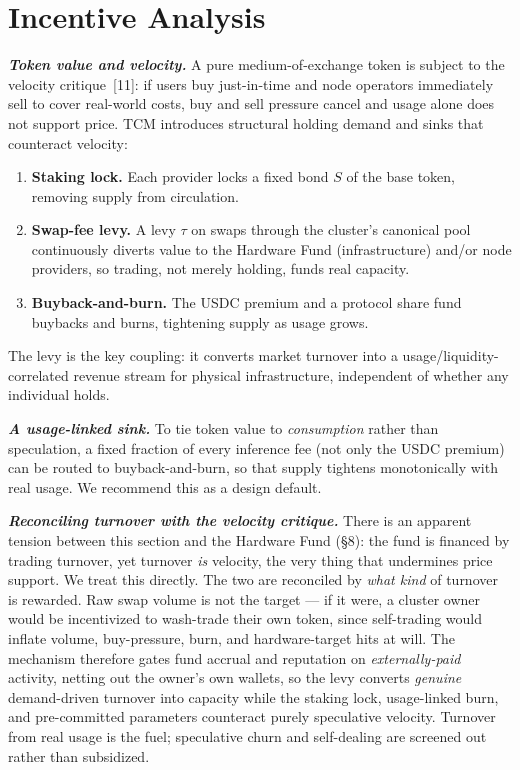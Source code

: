 \documentclass[11pt]{article}
\newcommand{\ph}[1]{\textbf{\textit{#1}}}
\begin{document}
\section{Incentive Analysis}\label{sec:incentives}
\ph{Token value and velocity.} A pure medium-of-exchange token is subject to the velocity critique~[11]: if users buy just-in-time and node operators immediately sell to cover real-world costs, buy and sell pressure cancel and usage alone does not support price. TCM introduces structural holding demand and sinks that counteract velocity:
\begin{enumerate}[leftmargin=1.4em,itemsep=0.1em]
\item \textbf{Staking lock.} Each provider locks a fixed bond $S$ of the base token, removing supply from circulation.
\item \textbf{Swap-fee levy.} A levy $\tau$ on swaps through the cluster's canonical pool continuously diverts value to the Hardware Fund (infrastructure) and/or node providers, so trading, not merely holding, funds real capacity.
\item \textbf{Buyback-and-burn.} The USDC premium and a protocol share fund buybacks and burns, tightening supply as usage grows.
\end{enumerate}
The levy is the key coupling: it converts market turnover into a usage/liquidity-correlated revenue stream for physical infrastructure, independent of whether any individual holds.

\ph{A usage-linked sink.} To tie token value to \textit{consumption} rather than speculation, a fixed fraction of every inference fee (not only the USDC premium) can be routed to buyback-and-burn, so that supply tightens monotonically with real usage. We recommend this as a design default.

\ph{Reconciling turnover with the velocity critique.} There is an apparent tension between this section and the Hardware Fund (\S8): the fund is financed by trading turnover, yet turnover \textit{is} velocity, the very thing that undermines price support. We treat this directly. The two are reconciled by \textit{what kind} of turnover is rewarded. Raw swap volume is not the target --- if it were, a cluster owner would be incentivized to wash-trade their own token, since self-trading would inflate volume, buy-pressure, burn, and hardware-target hits at will. The mechanism therefore gates fund accrual and reputation on \textit{externally-paid} activity, netting out the owner's own wallets, so the levy converts \textit{genuine} demand-driven turnover into capacity while the staking lock, usage-linked burn, and pre-committed parameters counteract purely speculative velocity. Turnover from real usage is the fuel; speculative churn and self-dealing are screened out rather than subsidized.
\end{document}
